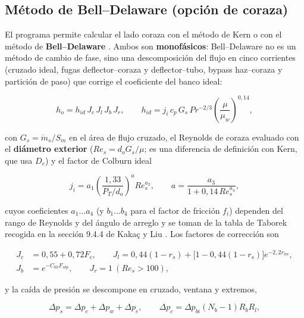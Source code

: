 \documentclass[11pt,a4paper]{article}
\begin{document}
\subsection{M\'etodo de Bell--Delaware (opci\'on de coraza)}
\label{sec:bell}

El programa permite calcular el lado coraza con el m\'etodo de Kern 
o con el m\'etodo de \textbf{Bell--Delaware} \cite{bell}. Ambos son \textbf{monof\'asicos}: Bell--Delaware 
no es un m\'etodo de cambio de fase, sino una descomposici\'on del flujo 
en cinco corrientes (cruzado ideal, fugas deflector--coraza y 
deflector--tubo, bypass haz--coraza y partici\'on de paso) que corrige el 
coeficiente del banco ideal:

\begin{equation}
h_o = h_{id}\,J_c\,J_l\,J_b\,J_r,\qquad
h_{id} = j_i\,c_p\,G_s\,Pr^{-2/3}\left(\frac{\mu}{\mu_w}\right)^{0{,}14},
\label{eq:hid}
\end{equation}

con $G_s = \dot m_s/S_m$ en el \'area de flujo cruzado, el 
Reynolds de coraza evaluado con el \textbf{di\'ametro exterior} ($Re_s = d_o G_s/\mu$; 
es una diferencia de definici\'on con Kern, que usa $D_e$) y el 
factor de Colburn ideal

\begin{equation}
j_i = a_1\left(\frac{1{,}33}{P_T/d_o}\right)^{a} Re_s^{a_2},\qquad
a = \frac{a_3}{1+0{,}14\,Re_s^{a_4}},
\label{eq:ji}
\end{equation}

cuyos coeficientes $a_1\ldots a_4$ (y $b_1\ldots b_4$ para el factor 
de fricci\'on $f_i$) dependen del rango de Reynolds y del \'angulo de 
arreglo y se toman de la tabla de Taborek \cite{taborek} recogida en la secci\'on 9.4.4 
de Kaka\c{c} y Liu \cite{kakac}. Los factores de correcci\'on son

\begin{align}
J_c &= 0{,}55 + 0{,}72 F_c, \qquad
J_l = 0{,}44(1-r_s) + \big[1-0{,}44(1-r_s)\big]e^{-2{,}2 r_{lm}},
\label{eq:jl}\\[2pt]
J_b &= e^{-C_{bh}F_{sbp}}, \qquad
J_r = 1 \ (Re_s>100),
\label{eq:jb}
\end{align}

y la ca\'ida de presi\'on se descompone en cruzado, ventana y 
extremos,

\begin{equation}
\Delta p_s = \Delta p_c + \Delta p_w + \Delta p_e,\qquad
\Delta p_c = \Delta p_{bi}(N_b-1)R_bR_l,
\label{eq:dpbd}
\end{equation}
\end{document}
